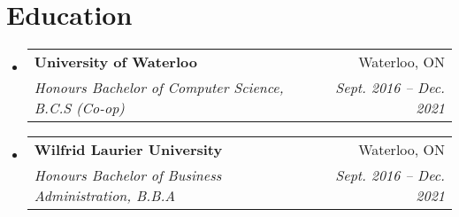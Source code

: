 \documentclass[letterpaper,11pt]{article}
\makeatletter
\newcommand{\resumeSubheading}[4]{
  \vspace{-2pt}\item
    \begin{tabular*}{0.97\textwidth}[t]{l@{\extracolsep{\fill}}r}
      \textbf{#1} & #2 \\
      \textit{\small#3} & \textit{\small #4} \\
    \end{tabular*}\vspace{-7pt}
}
\newcommand{\resumeSubHeadingListStart}{\begin{itemize}[leftmargin=0.15in, label={}]}
\newcommand{\resumeSubHeadingListEnd}{\end{itemize}}
\makeatother
\begin{document}
\section{Education}
  \resumeSubHeadingListStart
    \resumeSubheading
      {University of Waterloo}{Waterloo, ON}
      {Honours Bachelor of Computer Science, B.C.S (Co-op)}{Sept. 2016 -- Dec. 2021}
    \resumeSubheading
      {Wilfrid Laurier University}{Waterloo, ON}
      {Honours Bachelor of Business Administration, B.B.A}{Sept. 2016 -- Dec. 2021}
  \resumeSubHeadingListEnd




\end{document}
